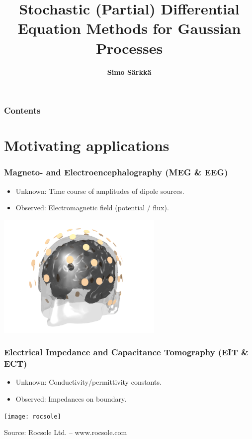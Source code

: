 \documentclass[first=dgreen,second=purple,presentation]{elecslides}
\title{ Stochastic (Partial) Differential Equation Methods for Gaussian Processes}
\author{{\bf Simo S\"arkk\"a}}
\institute{Aalto University, Finland}
\date{}
\begin{document}

\aaltotitleframe

\begin{frame}
  \frametitle{Contents}
  \tableofcontents[pausesections]
\end{frame}


\section{Motivating applications}

\begin{frame}
 \frametitle{Magneto- and Electroencephalography (MEG \& EEG)}

\begin{itemize}[<+->]
\item \alert{Unknown}: Time course of amplitudes of dipole sources.
 \item \alert{Observed}: Electromagnetic field (potential / flux).  
 \end{itemize}
 \begin{center}
 \includegraphics[width=0.6\textwidth]{head-col}
 \end{center}
\end{frame}

\begin{frame}
 \frametitle{Electrical Impedance and Capacitance Tomography (EIT \& ECT)}

 \begin{itemize}[<+->]
 \item \alert{Unknown}: Conductivity/permittivity constants.
 \item \alert{Observed}: Impedances on boundary.  
 \end{itemize}
 \begin{center}
 \texttt{[image: rocsole]}
  
 {\tiny Source: Rocsole Ltd. -- www.rocsole.com}
 \end{center}
\end{frame}
\end{document}
